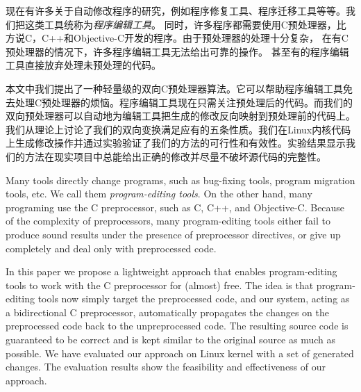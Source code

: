 
\begin{cabstract}
现在有许多关于自动修改程序的研究，例如程序修复工具、程序迁移工具等等。我们把这类工具统称为\emph{程序编辑工具}。
同时，许多程序都需要使用C预处理器，比方说C，C++和Objective-C开发的程序。由于预处理器的处理十分复杂，
在有C预处理器的情况下，许多程序编辑工具无法给出可靠的操作。
甚至有的程序编辑工具直接放弃处理未预处理的代码。

本文中我们提出了一种轻量级的双向C预处理器算法。它可以帮助程序编辑工具免去处理C预处理器的烦恼。程序编辑工具现在只需关注预处理后的代码。而我们的双向预处理器可以自动地为编辑工具把生成的修改反向映射到预处理前的代码上。我们从理论上讨论了我们的双向变换满足应有的五条性质。我们在Linux内核代码上生成修改操作并通过实验验证了我们的方法的可行性和有效性。实验结果显示我们的方法在现实项目中总能给出正确的修改并尽量不破坏源代码的完整性。
\end{cabstract}

\begin{eabstract}
Many tools directly change programs, such as bug-fixing tools, program migration tools, etc. We call them \emph{program-editing tools}. On the other hand, many programing use the C preprocessor, such as C, C++, and Objective-C. Because of the complexity of preprocessors, many program-editing tools either fail to produce sound results under the presence of preprocessor directives, or give up completely and deal only with preprocessed code.

In this paper we propose a lightweight approach that enables program-editing tools to work with the C preprocessor for (almost) free. The idea is that program-editing tools now simply target the preprocessed code, and our system, acting as a bidirectional C preprocessor, automatically propagates the changes on the preprocessed code back to the unpreprocessed code. The resulting source code is guaranteed to be correct and is kept similar to the original source as much as possible. We have evaluated our approach on Linux kernel with a set of generated changes. The evaluation results show the feasibility and effectiveness of our approach.
\end{eabstract}

